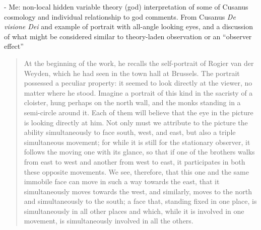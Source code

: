 - Me: non-local hidden variable theory (god) interpretation of some of Cusanus cosmology and individual relationship to god comments. From Cusanus \emph{De visione Dei} and example of portrait with all-angle looking eyes, and a discussion of what might be considered similar to theory-laden observation or an ``observer effect''

\begin{quote}
    At the beginning of the work, he recalls the self-portrait of Rogier van der Weyden, which he had seen in the town hall at Brussels.  The portrait possessed a peculiar property: it seemed to look directly at the viewer, no matter where he stood.  Imagine a portrait of this kind in the sacristy of a cloister, hung perhaps on the north wall, and the monks standing in a semi-circle around it.  Each of them will believe that the eye in the picture is looking directly at him.  Not only must we attribute to the picture the ability simultaneously to face south, west, and east, but also a triple simultaneous movement; for while it is still for the stationary observer, it follows the moving one with its glance, so that if one of the brothers walks from east to west and another from west to east, it participates in both these opposite movements.  We see, therefore, that this one and the same immobile face can move in such a way towards the east, that it simultaneously moves towards the west, and similarly, moves to the north and simultaneously to the south; a face that, standing fixed in one place, is simultaneously in all other places and which, while it is involved in one movement, is simultaneously involved in all the others.


\end{quote}
